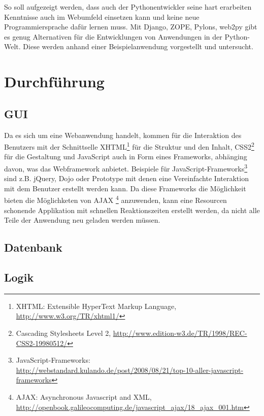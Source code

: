 So soll aufgezeigt werden, dass auch der Pythonentwickler seine hart erarbeiten
Kenntnisse auch im Webumfeld einsetzen kann und keine neue Programmiersprache
dafür lernen muss. Mit Django, ZOPE, Pylons, web2py gibt es genug Alternativen
für die Entwicklungen von Anwendungen in der Python-Welt. Diese werden anhand
einer Beispielanwendung vorgestellt und untersucht.

\section{Durchführung}
\subsection{GUI}
Da es sich um eine Webanwendung handelt, kommen für die Interaktion des
Benutzers mit der Schnittselle XHTML\footnote{XHTML: Extensible
HyperText Markup Language, \url{http://www.w3.org/TR/xhtml1/} } für die
Struktur und den Inhalt, CSS2\footnote{Cascading Stylesheets  Level 2,
\url{http://www.edition-w3.de/TR/1998/REC-CSS2-19980512/}} für die Gestaltung 
und JavaScript auch in Form eines Frameworks, abhänging davon, was das 
Webframework anbietet. Beispiele für
JavaScript-Frameworks\footnote{JavaScript-Frameworks:
\url{http://webstandard.kulando.de/post/2008/08/21/top-10-aller-javascript-
frameworks}} sind z.B. jQuery, Dojo oder Prototype mit denen eine Vereinfachte
Interaktion mit dem Benutzer erstellt werden kann. Da diese Frameworks die
Möglichkeit bieten die Möglichketen von  AJAX \footnote{AJAX: Asynchronous 
Javascript and XML,
\url{http://openbook.galileocomputing.de/javascript_ajax/18_ajax_001.htm}} 
anzuwenden, kann eine Resourcen schonende Applikation mit schnellen
Reaktionszeiten erstellt werden, da nicht alle Teile der Anwendung neu geladen 
werden müssen.

\subsection{Datenbank}
\subsection{Logik}